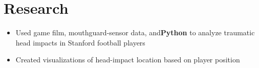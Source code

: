 \documentclass[]{houston-ethan-resume}
\begin{document}
\begin{minipage}[t]{0.66\textwidth}

\section{Research}
\begin{itemize}[noitemsep,topsep=0pt]
\itemsep-0.2em 
\item Used game film, mouthguard-sensor data, and ​​\textbf{Python} ​to analyze traumatic head impacts in Stanford football players
\item Created visualizations of head-impact location based on player position
\end{itemize}
\sectionsep

\end{minipage}
\end{document}
